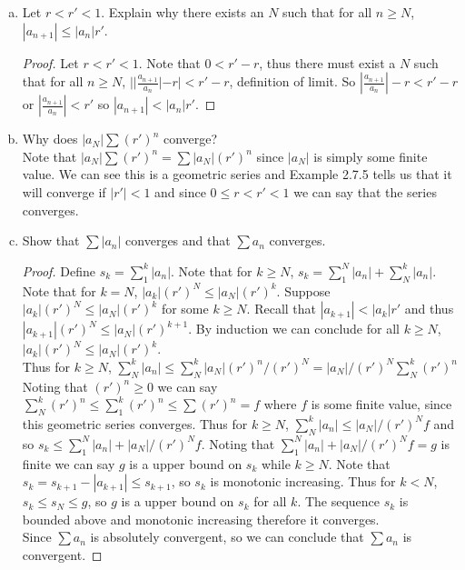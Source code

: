 \documentclass[12pt]{article}
\theoremstyle{homework}
\begin{document}
\begin{enumerate}[(a)]
\item
Let $r<r'<1$.  Explain why there exists an $N$ such that for all $n\geq N$, $|a_{n+1}|\leq |a_n|r'$.
\begin{proof}
Let $r<r'<1$.  Note that $0<r'-r$, thus there must exist a $N$ such that for all $n\geq N$, $||\frac{a_{n+1}}{a_n}|-r|<r'-r$, definition of limit.  So $|\frac{a_{n+1}}{a_n}|-r<r'-r$ or $|\frac{a_{n+1}}{a_n}|<r'$ so $|a_{n+1}|<|a_n|r'$.
\end{proof}
\item
Why does $|a_N|\sum(r')^n$ converge?\\
Note that $|a_N|\sum(r')^n=\sum|a_N|(r')^n$ since $|a_N|$ is simply some finite value.  We can see this is a geometric series and Example 2.7.5 tells us that it will converge if $|r'|<1$ and since $0\leq r<r'<1$ we can say that the series converges.
\item
Show that $\sum |a_n|$ converges and that $\sum a_n$ converges.\\
\begin{proof}
Define $s_k=\sum_1^k |a_n|$.  Note that for $k\geq N$, $s_k=\sum_1^N |a_n|+\sum_N^k |a_n|$.\\
Note that for $k=N$, $|a_k|(r')^N\leq |a_N|(r')^k$.  Suppose $|a_k|(r')^N\leq |a_N|(r')^k$ for some $k\geq N$.  Recall that $|a_{k+1}|<|a_k|r'$ and thus $|a_{k+1}|(r')^N\leq |a_N|(r')^{k+1}$.  By induction we can conclude for all $k\geq N$, $|a_k|(r')^N\leq |a_N|(r')^k$.\\
Thus for $k\geq N$, $\sum_N^k |a_n|\leq \sum_N^k |a_N|(r')^n/(r')^N=|a_N|/(r')^N\sum_N^k (r')^n$ Noting that $(r')^n\geq 0$ we can say $\sum_N^k (r')^n\leq \sum_1^k (r')^n\leq \sum (r')^n=f$ where $f$ is some finite value, since this geometric series converges.  Thus for $k\geq N$, $\sum_N^k |a_n|\leq |a_N|/(r')^N f$ and so $s_k\leq \sum_1^N |a_n|+|a_N|/(r')^N f$.  Noting that $\sum_1^N |a_n|+|a_N|/(r')^N f=g$ is finite we can say $g$ is a upper bound on $s_k$ while $k\geq N$.  Note that $s_k=s_{k+1}-|a_{k+1}|\leq s_{k+1}$, so $s_k$ is monotonic increasing.  Thus for $k<N$, $s_k\leq s_N\leq g$, so $g$ is a upper bound on $s_k$ for all $k$.  The sequence $s_k$ is bounded above and monotonic increasing therefore it converges.\\
Since $\sum a_n$ is absolutely convergent, so we can conclude that $\sum a_n$ is convergent.
\end{proof}
\end{enumerate}
\end{document}
